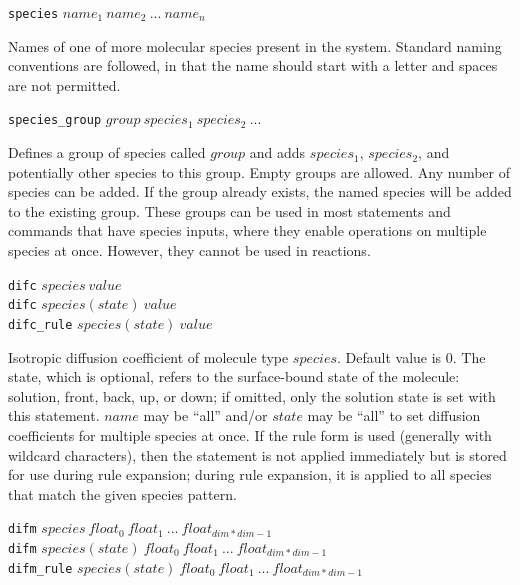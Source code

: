\documentclass {book}
\newcommand {\ttt} {\texttt}
\begin{document}
\begin{description}

\item{\ttt{species} $name_1\ name_2\ ...\ name_n$}

Names of one of more molecular species present in the system. Standard naming conventions are followed, in that the name should start with a letter and spaces are not permitted.

\item{\ttt{species\_group} $group\ species_1\ species_2\ ...$}

Defines a group of species called $group$ and adds $species_1$, $species_2$, and potentially other species to this group. Empty groups are allowed. Any number of species can be added. If the group already exists, the named species will be added to the existing group. These groups can be used in most statements and commands that have species inputs, where they enable operations on multiple species at once. However, they cannot be used in reactions.

\item{\ttt{difc} $species\ value$\\
\ttt{difc} $species(state)\ value$\\
\ttt{difc\_rule} $species(state)\ value$}

Isotropic diffusion coefficient of molecule type $species$. Default value is 0. The state, which is optional, refers to the surface-bound state of the molecule: solution, front, back, up, or down; if omitted, only the solution state is set with this statement. $name$ may be ``all'' and/or $state$ may be ``all'' to set diffusion coefficients for multiple species at once. If the rule form is used (generally with wildcard characters), then the statement is not applied immediately but is stored for use during rule expansion; during rule expansion, it is applied to all species that match the given species pattern.

\item{\ttt{difm} $species\ float_0\ float_1\ ...\ float_{dim*dim-1}$\\
\ttt{difm} $species(state)\ float_0\ float_1\ ...\ float_{dim*dim-1}$\\
\ttt{difm\_rule} $species(state)\ float_0\ float_1\ ...\ float_{dim*dim-1}$}


\end{description}
\end{document}
